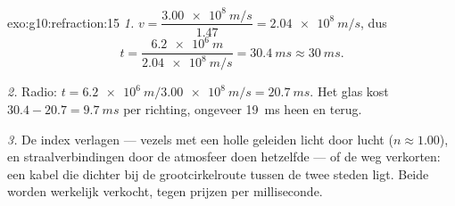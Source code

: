 \begin{solution}{exo:g10:refraction:15}
\emph{1.} $v = \dfrac{\qty{3.00e8}{m/s}}{1.47} = \qty{2.04e8}{m/s}$, dus
\[
t = \frac{\qty{6.2e6}{m}}{\qty{2.04e8}{m/s}} = \qty{30.4}{ms} \approx
\qty{30}{ms}.
\]

\emph{2.} Radio: $t = \qty{6.2e6}{m}/\qty{3.00e8}{m/s} =
\qty{20.7}{ms}$. Het glas kost $30.4 - 20.7 = \qty{9.7}{ms}$ per
richting, ongeveer \qty{19}{ms} heen en terug.

\emph{3.} De index verlagen --- vezels met een holle  geleiden licht
door lucht ($n \approx 1.00$), en straalverbindingen door de atmosfeer
doen hetzelfde --- of de weg verkorten: een kabel die dichter bij de
grootcirkelroute tussen de twee steden ligt. Beide worden werkelijk
verkocht, tegen prijzen per milliseconde.
\end{solution}

